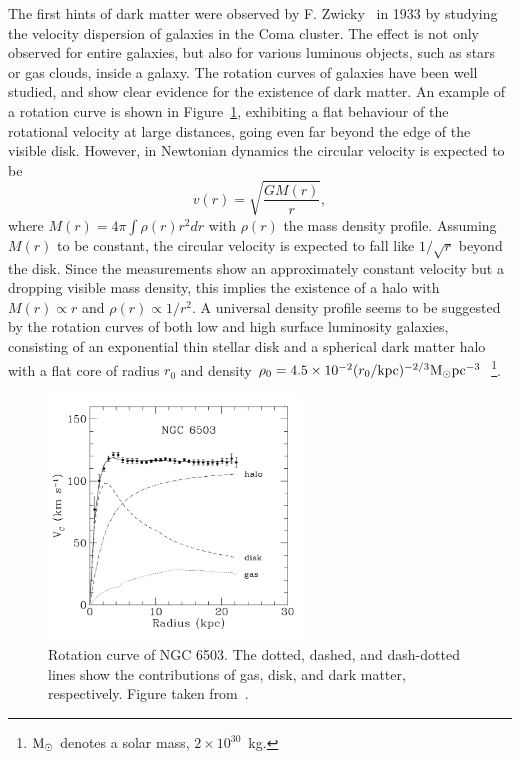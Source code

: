 The first hints of dark matter were observed by F. Zwicky~\cite{Zwicky:1933gu} in 1933 by studying the velocity dispersion of galaxies in the Coma cluster. The effect is not only observed for entire galaxies, but also for various luminous objects, such as stars or gas clouds, inside a galaxy. The rotation curves of galaxies have been well studied, and show clear evidence for the existence of dark matter. An example of a rotation curve is shown in Figure~\ref{fig:rotationcurves}, exhibiting a flat behaviour of the rotational velocity at large distances, going even far beyond the edge of the visible disk. However, in Newtonian dynamics the circular velocity is expected to be
\begin{equation}
 v(r) = \sqrt{\frac{GM(r)}{r}},
\end{equation}
where $M(r) = 4\pi\int\rho(r)r^2dr$ with $\rho(r)$ the mass density profile. Assuming $M(r)$ to be constant, the circular velocity is expected to fall like $1/\sqrt{r}$ beyond the disk. Since the measurements show an approximately constant velocity but a dropping visible mass density, this implies the existence of a halo with $M(r) \propto r$ and $\rho(r)\propto1/r^2$. A universal density profile seems to be suggested by the rotation curves of both low and high surface luminosity galaxies, consisting of an exponential thin stellar disk and a spherical dark matter halo with a flat core of radius $r_0$ and density $\rho_0 = 4.5\times 10^{-2}(r_0/\textup{kpc})^{-2/3}\textup{M}_\odot\textup{pc}^{-3}$~\cite{Salucci:2002jg}\footnote{$\textup{M}_\odot$ denotes a solar mass, $2 \times 10^{30}$~kg.}.

\begin{figure}[ht]
  \centering
  \includegraphics[width=0.6\textwidth]{rotational_curve.png}\hfill%
  \caption{Rotation curve of NGC 6503. The dotted, dashed, and dash-dotted lines show the contributions of gas, disk, and dark matter, respectively. Figure taken from~\cite{Begeman:1991iy}.}
  \label{fig:rotationcurves}
\end{figure}

